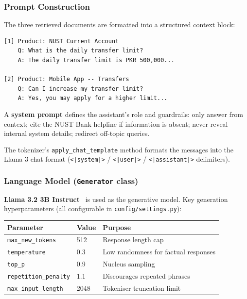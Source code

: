 \documentclass[12pt,a4paper]{article}
\begin{document}
\subsubsection{Prompt Construction}

The three retrieved documents are formatted into a structured context block:

\begin{lstlisting}[language={}, caption={Context block injected into prompt}]
[1] Product: NUST Current Account
    Q: What is the daily transfer limit?
    A: The daily transfer limit is PKR 500,000...

[2] Product: Mobile App -- Transfers
    Q: Can I increase my transfer limit?
    A: Yes, you may apply for a higher limit...
\end{lstlisting}

A \textbf{system prompt} defines the assistant's role and guardrails:
only answer from context; cite the NUST Bank helpline if information is absent;
never reveal internal system details; redirect off-topic queries.

The tokenizer's \texttt{apply\_chat\_template} method formats the messages
into the Llama 3 chat format (\texttt{<|system|>} / \texttt{<|user|>} /
\texttt{<|assistant|>} delimiters).

\subsubsection{Language Model (\texttt{Generator} class)}

\textbf{Llama 3.2 3B Instruct}~\cite{llama32} is used as the generative model.
Key generation hyperparameters (all configurable in \texttt{config/settings.py}):

\begin{center}
\begin{tabular}{lll}
  \toprule
  Parameter & Value & Purpose \\
  \midrule
  \texttt{max\_new\_tokens} & 512   & Response length cap \\
  \texttt{temperature}      & 0.3   & Low randomness for factual responses \\
  \texttt{top\_p}           & 0.9   & Nucleus sampling \\
  \texttt{repetition\_penalty} & 1.1 & Discourages repeated phrases \\
  \texttt{max\_input\_length}  & 2048 & Tokeniser truncation limit \\
  \bottomrule
\end{tabular}
\end{center}
\end{document}
